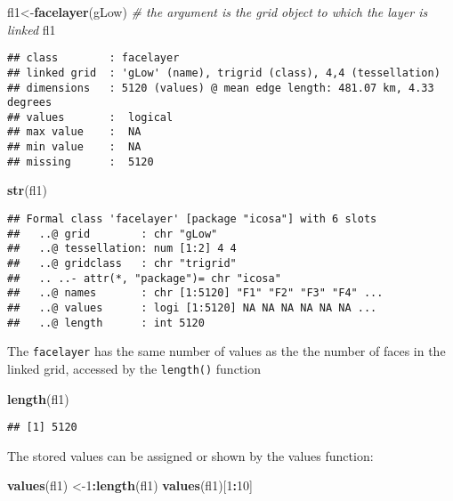 \documentclass[]{article}
\newenvironment{Shaded}{\begin{snugshade}}{\end{snugshade}}
\newcommand{\KeywordTok}[1]{\textcolor[rgb]{0.13,0.29,0.53}{\textbf{#1}}}
\newcommand{\DecValTok}[1]{\textcolor[rgb]{0.00,0.00,0.81}{#1}}
\newcommand{\CommentTok}[1]{\textcolor[rgb]{0.56,0.35,0.01}{\textit{#1}}}
\newcommand{\OperatorTok}[1]{\textcolor[rgb]{0.81,0.36,0.00}{\textbf{#1}}}
\newcommand{\NormalTok}[1]{#1}
\begin{document}
\begin{Shaded}
\begin{Highlighting}[]
\NormalTok{fl1<-}\KeywordTok{facelayer}\NormalTok{(gLow) }\CommentTok{# the argument is the grid object to which the layer is linked}
\NormalTok{fl1}
\end{Highlighting}
\end{Shaded}

\begin{verbatim}
## class        : facelayer
## linked grid  : 'gLow' (name), trigrid (class), 4,4 (tessellation)
## dimensions   : 5120 (values) @ mean edge length: 481.07 km, 4.33 degrees
## values       :  logical 
## max value    :  NA 
## min value    :  NA 
## missing      :  5120
\end{verbatim}

\begin{Shaded}
\begin{Highlighting}[]
\KeywordTok{str}\NormalTok{(fl1)}
\end{Highlighting}
\end{Shaded}

\begin{verbatim}
## Formal class 'facelayer' [package "icosa"] with 6 slots
##   ..@ grid        : chr "gLow"
##   ..@ tessellation: num [1:2] 4 4
##   ..@ gridclass   : chr "trigrid"
##   .. ..- attr(*, "package")= chr "icosa"
##   ..@ names       : chr [1:5120] "F1" "F2" "F3" "F4" ...
##   ..@ values      : logi [1:5120] NA NA NA NA NA NA ...
##   ..@ length      : int 5120
\end{verbatim}

The \texttt{facelayer} has the same number of values as the the number
of faces in the linked grid, accessed by the \texttt{length()} function

\begin{Shaded}
\begin{Highlighting}[]
\KeywordTok{length}\NormalTok{(fl1)}
\end{Highlighting}
\end{Shaded}

\begin{verbatim}
## [1] 5120
\end{verbatim}

The stored values can be assigned or shown by the values function:

\begin{Shaded}
\begin{Highlighting}[]
\KeywordTok{values}\NormalTok{(fl1) <-}\DecValTok{1}\OperatorTok{:}\KeywordTok{length}\NormalTok{(fl1)}
\KeywordTok{values}\NormalTok{(fl1)[}\DecValTok{1}\OperatorTok{:}\DecValTok{10}\NormalTok{]}
\end{Highlighting}
\end{Shaded}
\end{document}
